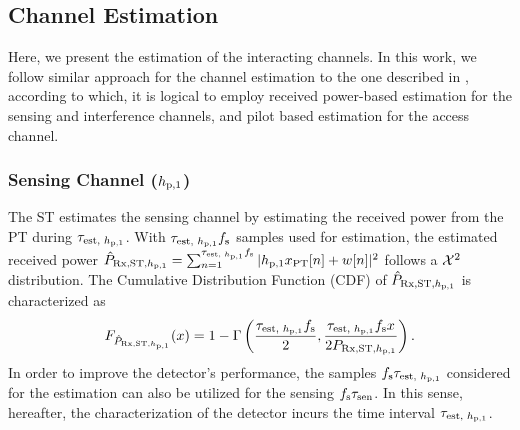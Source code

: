 \subsection*{Channel Estimation}
Here, we present the estimation of the interacting channels. In this work, we follow similar approach for the channel estimation to the one described in \cite{Kaushik16, Kaushik16_CL}, according to which, it is logical to employ received power-based estimation for the sensing and interference channels, and pilot based estimation for the access channel.  
\subsubsection*{Sensing Channel ($h_{\text{p,1}}$)}
The ST estimates the sensing channel by estimating the received power from the PT during $\tau_{\text{est, $h_{\text{p,1}}$}}$. With $\tau_{\text{est, $h_{\text{p,1}}$}} f_{\text{s}}$ samples used for estimation, the estimated received power $\hat{P}_{\text{Rx,ST,$h_{\text{p,1}}$}} = \sum_{n = 1}^{\tau_{\text{est, $h_{\text{p,1}}$}} f_{\text{s}}} |h_{\text{p,1}} x_{\text{PT}}[n] + w[n]|^2$ follows a $\cchi2$ distribution.
The Cumulative Distribution Function (CDF) of $\hat{P}_{\text{Rx,ST,$h_{\text{p,1}}$}}$ is characterized as
\begin{align}
F_{\hat{P}_{\text{Rx,ST,$h_{\text{p,1}}$}}}(x) = 1 - \Gamma \left( \frac{\tau_{\text{est, $h_{\text{p,1}}$}} f_{\text{s}}}{2}, \frac{\tau_{\text{est, $h_{\text{p,1}}$}} f_{\text{s}} x}{2 P_{\text{Rx,ST,$h_{\text{p,1}}$}}} \right) \label{eq:fprcvdstpt}.
\end{align}
In order to improve the detector's performance, the samples $f_{\text{s}} \tau_{\text{est, $h_{\text{p,1}}$}}$ considered for the estimation can also be utilized for the sensing $f_{\text{s}} \tau_{\text{sen}}$. In this sense, hereafter, the characterization of the detector incurs the time interval $\tau_{\text{est, $h_{\text{p,1}}$}}$. 
  
